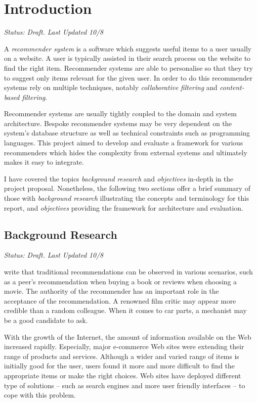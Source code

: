 \chapter{Introduction}

\emph{Status: Draft. Last Updated 10/8}

A \emph{recommender system} is a software which suggests useful items to a user usually on a website. A user is typically assisted in their search process on the website to find the right item. Recommender systems are able to personalise so that they try to suggest only items relevant for the given user. In order to do this recommender systems rely on multiple techniques, notably \emph{collaborative filtering} and \emph{content-based filtering}.

Recommender systems are usually tightly coupled to the domain and system architecture. Bespoke recommender systems may be very dependent on the system's database structure as well as technical constraints such as programming languages. This project aimed to develop and evaluate a framework for various recommenders which hides the complexity from external systems and ultimately makes it easy to integrate.

I have covered the topics \emph{background research} and \emph{objectives} in-depth in the project proposal. Nonetheless, the following two sections offer a brief summary of those with \emph{background research} illustrating the concepts and terminology for this report, and \emph{objectives} providing the framework for architecture and evaluation.

\section{Background Research}

\emph{Status: Draft. Last Updated 10/8}

\citet{ricci11} write that traditional recommendations can be observed in various scenarios, such as a peer's recommendation when buying a book or reviews when choosing a movie. The authority of the recommender has an important role in the acceptance of the recommendation. A renowned film critic may appear more credible than a random colleague. When it comes to car parts, a mechanist may be a good candidate to ask.

With the growth of the Internet, the amount of information available on the Web increased rapidly. Especially, major e-commerce Web sites were extending their range of products and services. Although a wider and varied range of items is initially good for the user, users found it more and more difficult to find the appropriate items or make the right choices. Web sites have deployed different type of solutions -- such as search engines and more user friendly interfaces -- to cope with this problem.


